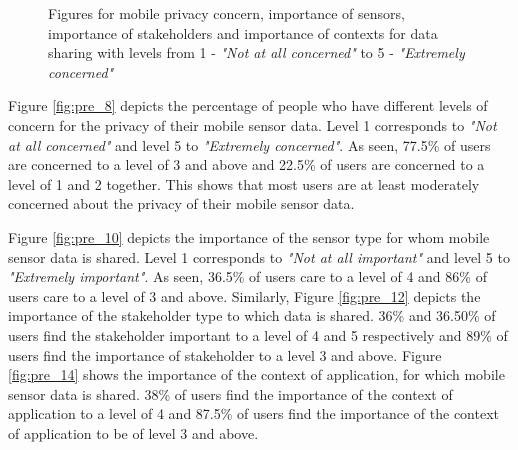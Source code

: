 \begin{figure}[htp]
\caption{Figures for mobile privacy concern, importance of sensors, importance of stakeholders and importance of contexts for data sharing with levels from
1 - \textit{"Not at all concerned"} to 5 - \textit{"Extremely concerned"}}
\label{fig:st3}
\end{figure}

Figure \ref{fig:pre_8} depicts the percentage of people who have different levels of concern for the privacy of their mobile sensor data. Level 1 corresponds to \textit{"Not at all concerned"} and level 5 to \textit{"Extremely concerned"}. As seen, 77.5\% of users are concerned to a level of 3 and above and 22.5\% of users are concerned to a level of 1 and 2 together. This shows that most users are at least moderately concerned about the privacy of their mobile sensor data.

Figure \ref{fig:pre_10} depicts the importance of the sensor type for whom mobile sensor data is shared. Level 1 corresponds to \textit{"Not at all important"} and level 5 to \textit{"Extremely important"}. As seen, 36.5\% of users care to a level of 4 and 86\% of users care to a level of 3 and above. Similarly, Figure \ref{fig:pre_12} depicts the importance of the stakeholder type to which data is shared. 36\% and 36.50\% of users find the stakeholder important to a level of 4 and 5 respectively and 89\% of users find the importance of stakeholder to a level 3 and above. Figure \ref{fig:pre_14} shows the importance of the context of application, for which mobile sensor data is shared. 38\% of users find the importance of the context of application to a level of 4 and 87.5\% of users find the importance of the context of application to be of level 3 and above.


